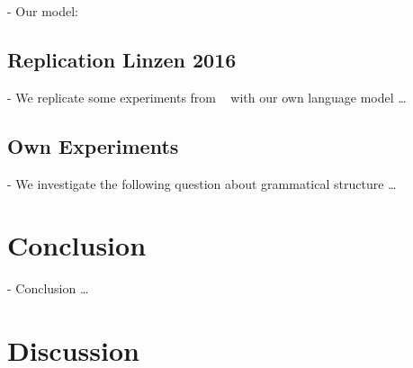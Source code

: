 \documentclass[twoside]{article}
\begin{document}
\begin{multicols}{2}
- Our model:

\subsection{Replication Linzen 2016}
\label{replication}

- We replicate some experiments from ~\cite{Linzen2016} with our own language model \ldots

\subsection{Own Experiments}
\label{own-experiments}

- We investigate the following question about grammatical structure \ldots

\section{Conclusion}
\label{conclusion}

- Conclusion \ldots

\section{Discussion}









\end{multicols}
\end{document}
